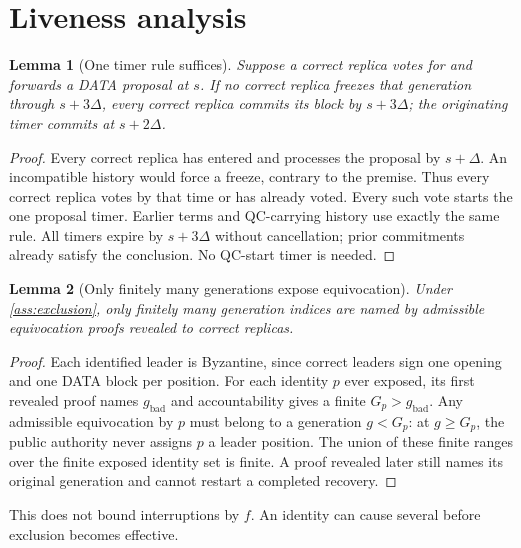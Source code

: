 \documentclass[11pt,a4paper]{article}
\newtheorem{lemma}[lemma]{Lemma}
\begin{document}
\section{Liveness analysis}
\label{sec:liveness}
\begin{lemma}[One timer rule suffices]
\label{lem:window}
Suppose a correct replica votes for and forwards a DATA proposal at $s$.
If no correct replica freezes that generation through $s+3\Delta$, every
correct replica commits its block by $s+3\Delta$; the originating timer
commits at $s+2\Delta$.
\end{lemma}
\begin{proof}
Every correct replica has entered and processes the proposal by $s+\Delta$.
An incompatible history would force a freeze, contrary to the premise.
Thus every correct replica votes by that time or has already voted.
Every such vote starts the one proposal timer. Earlier terms and
QC-carrying history use exactly the same rule. All timers expire by
$s+3\Delta$ without cancellation; prior commitments already satisfy
the conclusion. No QC-start timer is needed.
\end{proof}

\begin{lemma}[Only finitely many generations expose equivocation]
\label{lem:finite}
Under \cref{ass:exclusion}, only finitely many generation indices are
named by admissible equivocation proofs revealed to correct replicas.
\end{lemma}
\begin{proof}
Each identified leader is Byzantine, since correct leaders sign one
opening and one DATA block per position. For each identity $p$ ever exposed,
its first revealed proof names $g_{\mathrm{bad}}$ and accountability gives
a finite $G_p>g_{\mathrm{bad}}$. Any admissible equivocation by $p$ must
belong to a generation $g<G_p$: at $g\ge G_p$, the public authority
never assigns $p$ a leader position. The union of these finite ranges
over the finite exposed identity set is finite. A proof revealed later
still names its original generation and cannot restart a completed recovery.
\end{proof}
This does not bound interruptions by $f$. An identity can cause several
before exclusion becomes effective.
\end{document}
